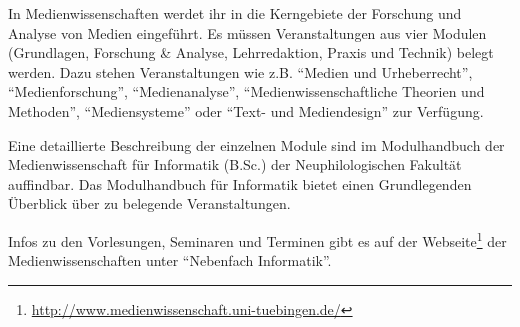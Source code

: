 In Medienwissenschaften werdet ihr in die Kerngebiete der Forschung und Analyse von Medien eingeführt. Es müssen Veranstaltungen aus vier Modulen (Grundlagen, Forschung \& Analyse, Lehrredaktion, Praxis und Technik) belegt werden. Dazu stehen Veranstaltungen wie z.B. "`Medien und Urheberrecht"', "`Medienforschung"', "`Medienanalyse"', "`Medienwissenschaftliche Theorien und Methoden"', "`Mediensysteme"' oder "`Text- und Mediendesign"' zur Verfügung.

Eine detaillierte Beschreibung der einzelnen Module sind im Modulhandbuch der Medienwissenschaft für Informatik (B.Sc.) der Neuphilologischen Fakultät auffindbar. Das Modulhandbuch für Informatik bietet einen Grundlegenden Überblick über zu belegende Veranstaltungen.

Infos zu den Vorlesungen, Seminaren und Terminen gibt es auf der Webseite\footnote{\url{http://www.medienwissenschaft.uni-tuebingen.de/}} der Medienwissenschaften unter "`Nebenfach Informatik"'.


